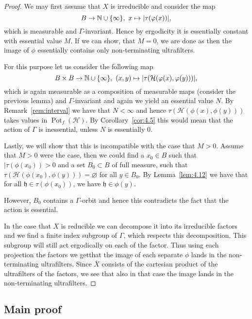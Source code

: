 \begin{proof}
  We may first assume that \(X\) is irreducible and consider the map
  \[
    B \to \mathbb{N} \cup \{\infty\},\ x \mapsto |\tau(\varphi(x))|,
  \]
  which is measurable and \(\Gamma\)-invariant. Hence by ergodicity it is essentially constant with essential value \(M\). If we can show, that \(M = 0\), we are done as then the image of \(\phi\) essentially contains only non-terminating ultrafilters.

  For this purpose let us consider the following map
  \[
    B \times B \to \mathbb{N} \cup \{\infty\},\ (x,y) \mapsto |\tau(\mathcal{H}(\varphi(x), \varphi(y)))|,
  \]
  which is again measurable as a composition of measurable maps (consider the previous lemma) and \(\Gamma\)-invariant and again we yield an essential value \(N\). By Remark~\ref{rem:interval} we have that \(N < \infty\) and hence \(\tau(\mathcal{H}(\phi(x), \phi(y)))\) takes values in \(\operatorname{Pot}_f(\mathcal{H})\). By Corollary~\ref{cor:4.5} this would mean that the action of \(\Gamma\) is inessential, unless \(N\) is essentially 0.

  Lastly, we will show that this is incompatible with the case that \(M > 0\). Assume that \(M > 0\) were the case, then we could find a \(x_0 \in B\) such that \(|\tau(\phi(x_0)) > 0\) and a set \(B_0 \subset B\) of full measure, such that \(\tau(\mathcal{H}(\phi(x_0), \phi(y))) = \varnothing\) for all \(y \in B_0\). By Lemma~\ref{lem:4.12} we have that for all \(\mathfrak{h} \in \tau(\phi(x_0))\), we have \(\mathfrak{h} \in \phi(y)\).

  However, \(B_0\) contains a \(\Gamma\)-orbit and hence this contradicts the fact that the action is essential.
  
  In the case that \(X\) is reducible we can decompose it into its irreducible factors and we find a finite index subgroup of \(\Gamma\), which respects this decomposition. This subgroup will still act ergodically on each of the factor. Thus using each projection the factors we getthat the image of each separate \(\phi\) lands in the non-terminating ultrafilters. Since \(\bar X\) consists of the cartesian product of the ultrafilters of the factors, we see that also in that case the image lands in the non-terminating ultrafilters.
\end{proof}

\subsection{Main proof}
\label{sec:main-proof}

